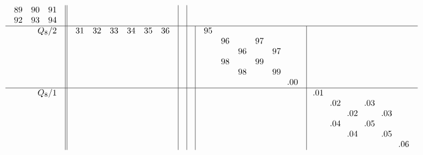 \documentclass[12pt,a4paper]{amsart}
\begin{document}
\begin{align*}
\begin{array}{r||c|c|c|c|c}
\begin{array}{ccc}
      89&90&91\\
      92&93&94\\
    \end{array}
&& \\ \hline
    \begin{array}{r}
      Q_8/2 \\ \\ \\ \\ \\ \\
    \end{array}
&
  \begin{array}{cccccc}
31&32&33&34&35&36\\
&&&&&\\
&&&&&\\
&&&&&\\
&&&&&\\
&&&&&\\
  \end{array}
&&&
  \begin{array}{cccccc}
95&&&&&\\
&96&&97&&\\
&&96&&97&\\
&98&&99&&\\
&&98&&99&\\
&&&&&\llap.00\\
  \end{array}
& \\ \hline
    \begin{array}{r}
      Q_8/1 \\ \\ \\ \\ \\ \\
    \end{array}
&&&&&
      \begin{array}{cccccc}
\llap.01&&&&&\\
&\llap.02&&\llap.03&&\\
&&\llap.02&&\llap.03&\\
&\llap.04&&\llap.05&&\\
&&\llap.04&&\llap.05&\\
&&&&&\llap.06\\
      \end{array}
  \end{array}
\end{align*}
\end{document}
